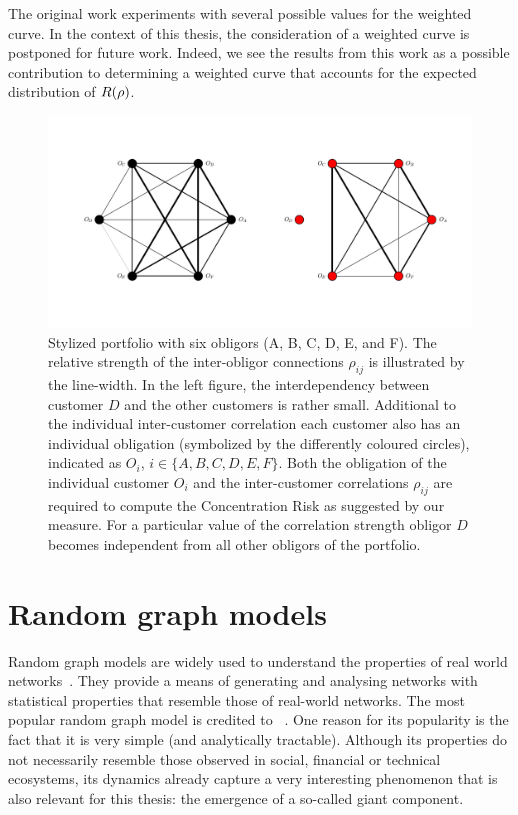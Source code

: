 \documentclass[12pt,beltcrest]{ociamthesis} %
\begin{document}
The original work experiments with several possible values for the weighted curve.
In the context of this thesis, the consideration of a weighted curve is postponed for future work.
Indeed, we see the results from this work as a possible contribution to determining a weighted curve that accounts for the expected distribution of $R(\rho)$.

\begin{figure}[tb]
	\centering
	\includegraphics[scale=0.5]{figures/ramping_parameter_example.png}
	\caption[Graph representation of stylized portfolio with six obligors]{
Stylized portfolio with six obligors (A, B, C, D, E, and F).
The relative strength of the inter-obligor connections $\rho_{ij}$ is illustrated by the line-width.
In the left figure, the interdependency between customer $D$ and the other customers is rather small.
Additional to the individual inter-customer correlation each customer also has an individual obligation (symbolized by the differently coloured circles), indicated as $O_i$, $i \in \{A, B, C, D, E, F \}$.
Both the obligation of the individual customer $O_i$ and the inter-customer correlations $\rho_{ij}$ are required to compute the Concentration Risk as suggested by our measure.
For a particular value of the correlation strength obligor $D$ becomes independent from all other obligors of the portfolio.
	}
	\label{fig:6_pf_ramping}
\end{figure}

 





\section{Random graph models} %
\label{sec:random_graph_models}

Random graph models are widely used to understand the properties of real world networks~\cite{newman2002random}.
They provide a means of generating and analysing networks with statistical properties that resemble those of real-world networks.
The most popular random graph model is credited to %
~\cite{erdos1959random}.
One reason for its popularity is the fact that it is very simple (and analytically tractable).
Although its properties do not necessarily resemble those observed in social, financial or technical ecosystems, its dynamics already capture a very interesting phenomenon that is also relevant for this thesis: the emergence of a so-called giant component.
\end{document}
